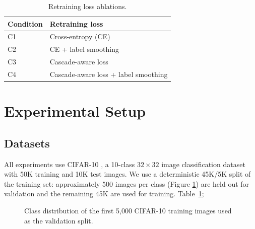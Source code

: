 \documentclass[conference]{IEEEtran}
\begin{document}
\begin{table}[H]
\centering
\caption{Retraining loss ablations.}
\label{tab:retraining-loss-ablations}
\begin{tabular}{ll}
\toprule
\textbf{Condition} & \textbf{Retraining loss} \\
\midrule
C1 & Cross-entropy (CE) \\
C2 & CE + label smoothing \\
C3 & Cascade-aware loss \\
C4 & Cascade-aware loss + label smoothing \\
\bottomrule
\end{tabular}
\end{table}

\section{Experimental Setup}
\label{sec:experiments}

\subsection{Datasets}

All experiments use CIFAR-10 \cite{krizhevsky2009cifar}, a 10-class
$32\times 32$ image classification dataset with 50K training and 10K test
images. We use a deterministic 45K/5K split of the training set: approximately 500 images
per class (Figure \ref{fig:cifar10_validation_split}) are held out for validation and the remaining 45K are used for
training. Table~\ref{tab:retraining-loss-ablations};
\begin{figure}[t]
\centering
{}
\caption{Class distribution of the first 5,000 CIFAR-10 training images used as the validation split.}
\label{fig:cifar10_validation_split}
\end{figure}
\end{document}
